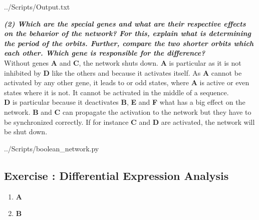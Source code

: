 \documentclass[10pt,a4paper]{article}
\newcommand{\exercise}[1]
{
  \stepcounter{subsection}
  \subsection*{Exercise \thesubsection: #1}

}
\begin{document}
\begin{enumerate}
\newpage
 {../Scripts/Output.txt}


\textbf{\textit{(2) Which are the special genes and what are their respective effects on the behavior of the
		network? For this, explain what is determining the period of the orbits. Further, compare
		the two shorter orbits which each other. Which gene is responsible for the difference?}}\\
	
	Without genes \textbf{A} and \textbf{C}, the network shuts down. \textbf{A} is particular as it is not inhibited by \textbf{D} like the others and because it activates itself. As \textbf{A} cannot be activated by any other gene, it leads to or odd states, where \textbf{A} is active or even states where it is not. It cannot be activated in the middle of a sequence. \\
	
	
	\textbf{D} is particular because it deactivates \textbf{B}, \textbf{E} and \textbf{F} what has a big effect on the network. \textbf{B} and \textbf{C} can propagate the activation to the network but they have to be synchronized correctly. If for instance \textbf{C} and \textbf{D} are activated, the network will be shut down. 
	
	



\end{enumerate}


\newpage
 {../Scripts/boolean\string_network.py}




\newpage
\exercise{Differential Expression Analysis}
\begin{enumerate}
	
	\item \textbf{A}\\

	
	\item \textbf{B}\\
	
	
	
	
	
\end{enumerate}
\end{document}

